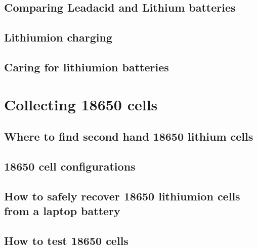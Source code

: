 \documentclass[letterpaper,10pt,english]{sphinxmanual}
\begin{document}
\section{Comparing Lead\sphinxhyphen{}acid and Lithium batteries}
\label{\detokenize{what_are_lithium-ion_battery_cells:comparing-lead-acid-and-lithium-batteries}}

\section{Lithium\sphinxhyphen{}ion charging}
\label{\detokenize{what_are_lithium-ion_battery_cells:lithium-ion-charging}}

\section{Caring for lithium\sphinxhyphen{}ion batteries}
\label{\detokenize{what_are_lithium-ion_battery_cells:caring-for-lithium-ion-batteries}}

\chapter{Collecting 18650 cells}
\label{\detokenize{collecting_18650_cells:collecting-18650-cells}}\label{\detokenize{collecting_18650_cells::doc}}

\section{Where to find second hand 18650 lithium cells}
\label{\detokenize{collecting_18650_cells:where-to-find-second-hand-18650-lithium-cells}}

\section{18650 cell configurations}
\label{\detokenize{collecting_18650_cells:cell-configurations}}

\section{How to safely recover 18650 lithium\sphinxhyphen{}ion cells from a laptop battery}
\label{\detokenize{collecting_18650_cells:how-to-safely-recover-18650-lithium-ion-cells-from-a-laptop-battery}}

\section{How to test 18650 cells}
\label{\detokenize{collecting_18650_cells:how-to-test-18650-cells}}
\end{document}
